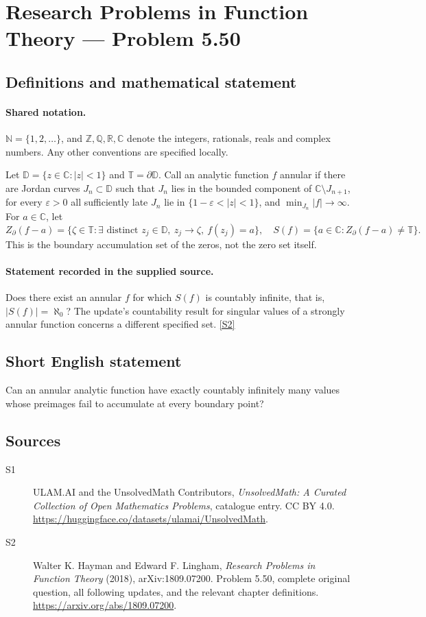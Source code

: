 \documentclass[11pt]{book}
\newcommand{\sref}[2]{\hyperlink{source:#1:#2}{[S#2]}}
\begin{document}
\section{Research Problems in Function Theory — Problem 5.50}\label{statement}

\subsection{Definitions and mathematical statement}

\paragraph{Shared notation.}$\mathbb N=\{1,2,\ldots\}$, and $\mathbb Z,\mathbb Q,\mathbb R,\mathbb C$ denote the integers, rationals, reals and complex numbers. Any other conventions are specified locally.


Let $\mathbb D=\{z\in\mathbb C:|z|<1\}$ and $\mathbb T=\partial\mathbb D$. Call an analytic function $f$ annular if there are Jordan curves $J_n\subset\mathbb D$ such that $J_n$ lies in the bounded component of $\mathbb C\setminus J_{n+1}$, for every $\varepsilon>0$ all sufficiently late $J_n$ lie in $\{1-\varepsilon<|z|<1\}$, and $\min_{J_n}|f|\to\infty$. For $a\in\mathbb C$, let \[Z_{\partial}(f-a)=\{\zeta\in\mathbb T:\exists\text{ distinct }z_j\in\mathbb D,\ z_j\to\zeta,\ f(z_j)=a\},\quad S(f)=\{a\in\mathbb C:Z_{\partial}(f-a)\ne\mathbb T\}.\] This is the boundary accumulation set of the zeros, not the zero set itself.
\paragraph{Statement recorded in the supplied source.}
Does there exist an annular $f$ for which $S(f)$ is countably infinite, that is, $|S(f)|=\aleph_0$? The update’s countability result for singular values of a strongly annular function concerns a different specified set. \sref{statement}{2}
\subsection{Short English statement}
Can an annular analytic function have exactly countably infinitely many values whose preimages fail to accumulate at every boundary point?
\subsection{Sources}
\begin{description}
\item[\hypertarget{source:statement:1}{S1}] ULAM.AI and the UnsolvedMath Contributors, \emph{UnsolvedMath: A Curated Collection of Open Mathematics Problems}, catalogue entry. CC BY 4.0. \url{https://huggingface.co/datasets/ulamai/UnsolvedMath}.
\item[\hypertarget{source:statement:2}{S2}] Walter K. Hayman and Edward F. Lingham, \emph{Research Problems in Function Theory} (2018), arXiv:1809.07200. Problem 5.50, complete original question, all following updates, and the relevant chapter definitions. \url{https://arxiv.org/abs/1809.07200}.
\end{description}
\label{end:statement}
\end{document}
